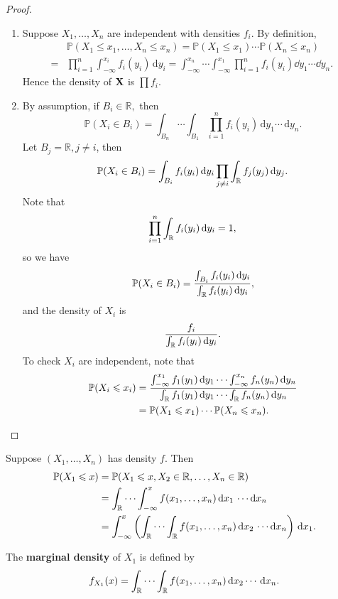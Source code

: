 \begin{proof}
    \begin{enumerate}
        \item Suppose $ X_1,\dots,X_n $ are independent with densities $ f_i $. By definition, 
        \begin{align*}
            &\mathbb{P}(X_1\le x_1,\dots, X_n\le x_n) = \mathbb{P}(X_1\le x_1)\cdots \mathbb{P}(X_n\le x_n)\\ 
            =& \prod_{i=1}^{n} \int_{-\infty}^{x_i} f_i(y_i) \,\mathrm{d}y_i
            = \int_{-\infty}^{x_n} \cdots \int_{-\infty}^{x_1} \prod_{i=1}^{n}f_i(y_i)\dd y_1\cdots\dd y_n.\ 
        \end{align*}
        Hence the density of ${\bf X}$ is $\prod f_i $.
        \item By assumption, if $ B_i\in \mathbb{R}, $ then 
        \[
            \mathbb{P}(X_i\in B_i) = \int_{B_n} \cdots \int_{B_1} \prod_{i=1}^{n}f_i(y_i) \,\mathrm{d}y_1\cdots \,\mathrm{d}y_n.
        \]
        Let $ B_j=\mathbb{R}, j\neq i $, then 
        \[
            \mathbb{P}(X_i\in B_i)= \int_{B_i} f_i(y_i) \,\mathrm{d}y_i \prod_{j\neq i} \int_{{\mathbb{R}}} f_j(y_j) \,\mathrm{d}y_j.
        \]
        Note that 
        \[
            \prod_{i=1}^{n}\int_{{\mathbb{R}}} f_i(y_i) \,\mathrm{d}y_i=1,
        \]
        so we have 
        \[
            \mathbb{P}(X_i\in B_i) = \frac{\int_{B_i} f_i(y_i) \,\mathrm{d}y_i}{\int_{{\mathbb{R}}} f_i(y_i) \,\mathrm{d}y_i},
        \]
        and the density of $X_i$ is 
        \[
            \frac{f_i}{\int_{{\mathbb{R}}} f_i(y_i) \,\mathrm{d}y_i}.
        \]
        To check $X_i$ are independent, note that 
        \begin{align*}
            \mathbb{P}(X_i\leqslant x_i)&= \frac{\int_{-\infty}^{x_1} f_1(y_1) \,\mathrm{d}y_1 \cdots \int_{-\infty}^{x_n} f_n(y_n) \,\mathrm{d}y_n}{\int_{{\mathbb{R}}} f_1(y_1) \,\mathrm{d}y_1 \cdots \int_{{\mathbb{R}}} f_n(y_n) \,\mathrm{d}y_n}\\ 
            &= \mathbb{P}(X_1\leqslant x_1)\cdots \mathbb{P}(X_n\leqslant x_n).\qedhere
        \end{align*}
    \end{enumerate}
\end{proof}

Suppose $ (X_1,\dots,X_n) $ has density $f$. Then 
\begin{align*}
    \mathbb{P}(X_1\leqslant x)&= \mathbb{P}(X_1\leqslant x,X_2\in \mathbb{R}, \dots, X_n \in \mathbb{R})\\ 
    &= \int_{{\mathbb{R}}} \cdots \int_{-\infty}^{x} f(x_1,\dots,x_n) \,\mathrm{d}x_1 \, \cdots \mathrm{d}x_n\\ 
    &= \int_{-\infty}^{x} \left( \int_{{\mathbb{R}}}\cdots \int_{{\mathbb{R}}} f(x_1,\dots,x_n) \,\mathrm{d}x_2 \,\cdots\mathrm{d}x_n \right) \,\mathrm{d}x_1.
\end{align*}
\begin{definition}
    The \textbf{marginal density} of $X_1$ is defined by 
    \[
        f_{X_1}(x) = \int_{{\mathbb{R}}}\cdots \int_{{\mathbb{R}}} f(x_1,\dots,x_n) \,\mathrm{d}x_2\cdots \,\mathrm{d}x_n.
    \]
\end{definition}
